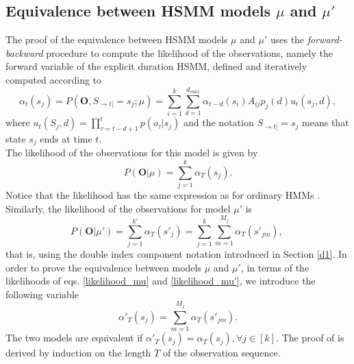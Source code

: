 \documentclass[extendedabs]{recpad2k}
\begin{document}
\subsection{Equivalence between HSMM models $\mu$ and $\mu'$}
\label{d2}
The proof of the equivalence between HSMM models $\mu$ and $\mu'$ uses the \textit{forward-backward} procedure to compute the likelihood of the observations, namely the forward variable of the explicit duration HSMM, defined and iteratively computed according to
\begin{equation}
\alpha_t(s_j) = P(\textbf{O}, S_{\rightarrow t|}=s_j;\mu) = \sum_{i=1}^k \sum_{d=1}^{d_{max}} \alpha_{t-d}(s_i)A_{ij}p_j(d)u_t(s_j,d),
    \label{forward_hsmm2}
\end{equation}
where $u_t(S_j,d)=\prod_{\tau=t-d+1}^t p(o_\tau|s_j)$ and the notation $S_{\rightarrow t|}=s_j$ means that state $s_j$ ends at time $t$. \\ \noindent
The likelihood of the observations for this model is given by
\begin{equation}
    P(\textbf{O}|\mu) = \sum_{j=1}^k \alpha_T(s_j).
     \label{likelihood_mu}
\end{equation}
Notice that the likelihood has the same expression as for ordinary HMMs \cite{rabiner1989tutorial}.
Similarly, the likelihood of the observations for model $\mu'$ is
\begin{equation}
    P(\textbf{O}|\mu')=\sum_{j=1}^{k'} \alpha_T(s'_j)=\sum_{j=1}^k \sum_{m=1}^{M_j} \alpha_T(s'_{jm}),~
    \label{likelihood_mu'}
\end{equation}
that is, using the double index component notation introduced in Section \ref{d1}. In order to prove the equivalence between models $\mu$ and $\mu'$, in terms of the likelihoods of eqs. \eqref{likelihood_mu} and \eqref{likelihood_mu'}, we introduce the following variable
\begin{equation}
    \alpha'_T(s_j) = \sum_{m=1}^{M_j} \alpha_T(s'_{jm}).
    \label{def_components}
\end{equation}
The two models are equivalent if $\alpha'_T(s_j) = \alpha_T(s_j),  \forall j\in[k]$. 
The proof of is derived by induction on the length $T$ of the observation sequence.
\end{document}
